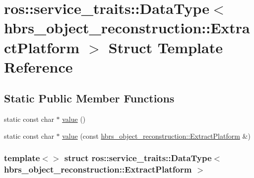 \hypertarget{structros_1_1service__traits_1_1_data_type_3_01hbrs__object__reconstruction_1_1_extract_platform_01_4}{\section{ros\-:\-:service\-\_\-traits\-:\-:\-Data\-Type$<$ hbrs\-\_\-object\-\_\-reconstruction\-:\-:\-Extract\-Platform $>$ \-Struct \-Template \-Reference}
\label{structros_1_1service__traits_1_1_data_type_3_01hbrs__object__reconstruction_1_1_extract_platform_01_4}
}
\subsection*{\-Static \-Public \-Member \-Functions}
\begin{DoxyCompactItemize}
\item 
static const char $\ast$ \hyperlink{structros_1_1service__traits_1_1_data_type_3_01hbrs__object__reconstruction_1_1_extract_platform_01_4_ac738792dd1ce3901abc3de7a9dfdf658}{value} ()
\item 
static const char $\ast$ \hyperlink{structros_1_1service__traits_1_1_data_type_3_01hbrs__object__reconstruction_1_1_extract_platform_01_4_a9aca832feaf70243794a0981bc874bf3}{value} (const \hyperlink{structhbrs__object__reconstruction_1_1_extract_platform}{hbrs\-\_\-object\-\_\-reconstruction\-::\-Extract\-Platform} \&)
\end{DoxyCompactItemize}
\subsubsection*{template$<$$>$ struct ros\-::service\-\_\-traits\-::\-Data\-Type$<$ hbrs\-\_\-object\-\_\-reconstruction\-::\-Extract\-Platform $>$}



